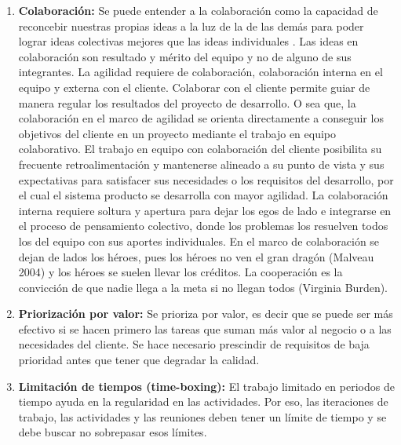 \begin{enumerate}
\item \textbf{Colaboración:} Se puede entender a la colaboración como la capacidad de reconcebir nuestras propias ideas a la luz de la de las demás \cite{Austin-2003} para poder lograr ideas colectivas mejores que las ideas individuales \cite{UNTREF-2014}. Las ideas en colaboración son resultado y mérito del equipo y no de alguno de sus integrantes. La agilidad requiere de colaboración, colaboración interna en el equipo y externa con el cliente. Colaborar con el cliente permite guiar de manera regular los resultados del proyecto de desarrollo. O sea que, la colaboración en el marco de agilidad se orienta directamente a conseguir los objetivos del cliente en un proyecto mediante el trabajo en equipo colaborativo. El trabajo en equipo con colaboración del cliente posibilita su frecuente retroalimentación y mantenerse alineado a su punto de vista y sus expectativas para satisfacer sus necesidades o los requisitos del desarrollo, por el cual el sistema producto se desarrolla con mayor agilidad. La colaboración interna requiere soltura y apertura para dejar los egos de lado e integrarse en el proceso de pensamiento colectivo, donde los problemas los resuelven todos los del equipo con sus aportes individuales. En el marco de colaboración se dejan de lados los héroes, pues los héroes no ven el gran dragón (Malveau 2004) y los héroes se suelen llevar los créditos. La cooperación es la convicción de que nadie llega a la meta si no llegan todos (Virginia Burden).

\item \textbf{Priorización por valor:} Se prioriza por valor, es decir que se puede ser más efectivo si se hacen primero las tareas que suman más valor al negocio o a las necesidades del cliente. Se hace necesario prescindir de requisitos de baja prioridad antes que tener que degradar la calidad.

\item \textbf{Limitación de tiempos (time-boxing):} El trabajo limitado en periodos de tiempo ayuda en la regularidad en las actividades. Por eso, las iteraciones de trabajo, las actividades y las reuniones deben tener un límite de tiempo y se debe buscar no sobrepasar esos límites.


\end{enumerate}

